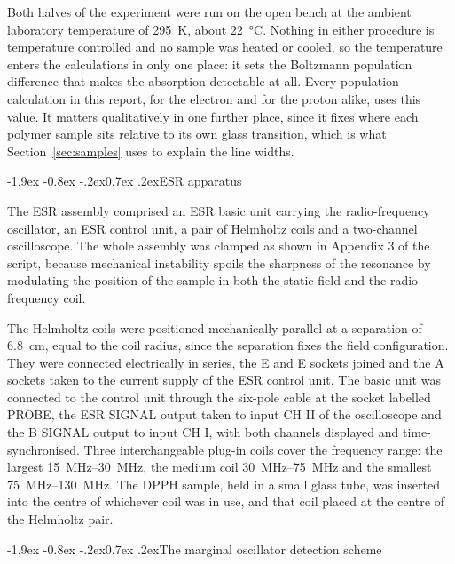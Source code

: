 \documentclass[11pt,a4paper]{article}
\makeatletter
\renewcommand\subsection{\@startsection{subsection}{2}{\z@}%
  {-1.9ex \@plus -0.8ex \@minus -.2ex}{0.7ex \@plus .2ex}{\normalfont\normalsize\bfseries}}
\makeatother
\begin{document}
Both halves of the experiment were run on the open bench at the ambient laboratory temperature of
\SI{295}{\kelvin}, about \SI{22}{\celsius}. Nothing in either procedure is temperature controlled
and no sample was heated or cooled, so the temperature enters the calculations in only one place:
it sets the Boltzmann population difference that makes the absorption detectable at all. Every
population calculation in this report, for the electron and for the proton alike, uses this value.
It matters qualitatively in one further place, since it fixes where each polymer sample sits
relative to its own glass transition, which is what Section~\ref{sec:samples} uses to explain the
line widths.

\subsection{ESR apparatus}

The ESR assembly comprised an ESR basic unit carrying the radio-frequency oscillator, an ESR
control unit, a pair of Helmholtz coils and a two-channel oscilloscope. The whole assembly was
clamped as shown in Appendix 3 of the script, because mechanical instability spoils the sharpness
of the resonance by modulating the position of the sample in both the static field and the
radio-frequency coil.

The Helmholtz coils were positioned mechanically parallel at a separation of
\SI{6.8}{\centi\metre}, equal to the coil radius, since the separation fixes the field
configuration. They were connected electrically in series, the E and E sockets joined and the A
sockets taken to the current supply of the ESR control unit. The basic unit was connected to the
control unit through the six-pole cable at the socket labelled PROBE, the ESR SIGNAL output taken
to input CH II of the oscilloscope and the B SIGNAL output to input CH I, with both channels
displayed and time-synchronised. Three interchangeable plug-in coils cover the frequency range:
the largest \SIrange{15}{30}{\mega\hertz}, the medium coil \SIrange{30}{75}{\mega\hertz} and the
smallest \SIrange{75}{130}{\mega\hertz}. The DPPH sample, held in a small glass tube, was inserted
into the centre of whichever coil was in use, and that coil placed at the centre of the Helmholtz
pair.

\subsection{The marginal oscillator detection scheme}
\label{sec:marginal}
\end{document}
